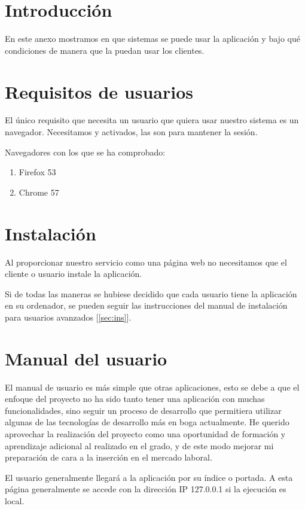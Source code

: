 
\section{Introducción}
En este anexo mostramos en que sistemas se puede usar la aplicación y bajo qué condiciones de manera que la puedan usar los clientes.

\section{Requisitos de usuarios}
El único requisito que necesita un usuario que quiera usar nuestro sistema es un navegador. Necesitamos  y  activados, las  son para mantener la sesión.

Navegadores con los que se ha comprobado:
\begin{enumerate}
\item Firefox 53 
\item Chrome 57
\end{enumerate}


\section{Instalación}
Al proporcionar nuestro servicio como una página web no necesitamos que el cliente o usuario instale la aplicación. 

Si de todas las maneras se hubiese decidido que cada usuario tiene la aplicación en su ordenador, se pueden seguir las instrucciones del manual de instalación para usuarios avanzados [\ref{sec:ins}].

\section{Manual del usuario}
El manual de usuario es más simple que otras aplicaciones, esto se debe a que el enfoque del proyecto no ha sido tanto tener una aplicación con muchas funcionalidades, sino seguir un proceso de desarrollo que permitiera utilizar algunas de las tecnologías de desarrollo más en boga actualmente. He querido aprovechar la realización del proyecto como una oportunidad de formación y aprendizaje adicional al realizado en el grado, y de este modo mejorar mi preparación de cara a la inserción en el mercado laboral.

El usuario generalmente llegará a la aplicación por su índice o portada. A esta página generalmente se accede con la dirección IP 127.0.0.1 si la ejecución es local.

